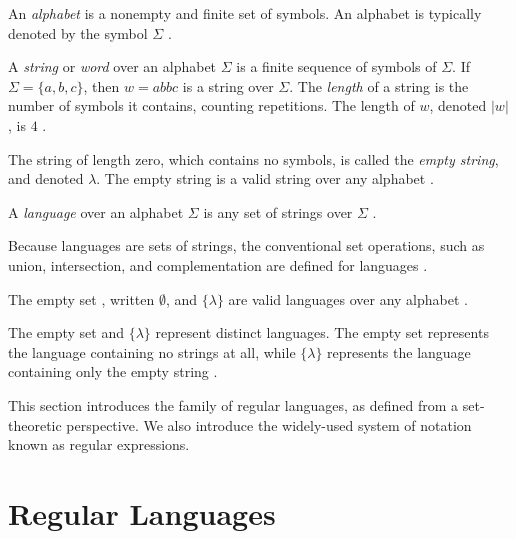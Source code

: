 \documentclass{bcthesis}
\newcommand{\footcite}[2]{\xspace\cite[pg.~{#2}]{#1}\xspace}
\begin{document}
		\begin{definition}[Alphabet]
			An \textit{alphabet} is a nonempty and finite set of symbols.
			An alphabet is typically denoted by the symbol $\Sigma$ \footcite{salomaa}{1}.
		\end{definition}

		\begin{definition}[String]
			A \textit{string} or \textit{word} over an alphabet $\Sigma$ is a finite sequence of symbols of $\Sigma$.
			If $\Sigma = \{ a, b ,c \}$, then $w = abbc$ is a string over $\Sigma$.
			The \textit{length} of a string is the number of symbols it contains, counting repetitions.
			The length of $w$, denoted $|w|$, is $4$ \footcite{hopcroft}{1}.

			The string of length zero, which contains no symbols, is called the \textit{empty string}, and denoted $\lambda$.
			The empty string is a valid string over any alphabet \footcite{salomaa}{1}.
		\end{definition}

		\begin{definition}[Language]
			A \textit{language} over an alphabet $\Sigma$ is any set of strings over $\Sigma$ \footcite{hopcroft}{2}.

			Because languages are sets of strings, the conventional set operations, such as union, intersection, and complementation are defined for languages \footcite{hopcroft}{5}.

			The empty set , written $\emptyset$, and $\{ \lambda \}$ are valid languages over any alphabet \footcite{hopcroft}{2}.
		\end{definition}

		\begin{remark}
			The empty set and $\{ \lambda \}$ represent distinct languages. 
			The empty set represents the language containing no strings at all, while $\{ \lambda \}$ represents the language containing only the empty string \footcite{hopcroft}{2}.
		\end{remark}

\label{ch:regular_languages_and_expressions}
	
	This section introduces the family of regular languages, as defined from a set-theoretic perspective.
	We also introduce the widely-used system of notation known as regular expressions.

	\section{Regular Languages} %
	\label{sec:regular_languages}
\end{document}
